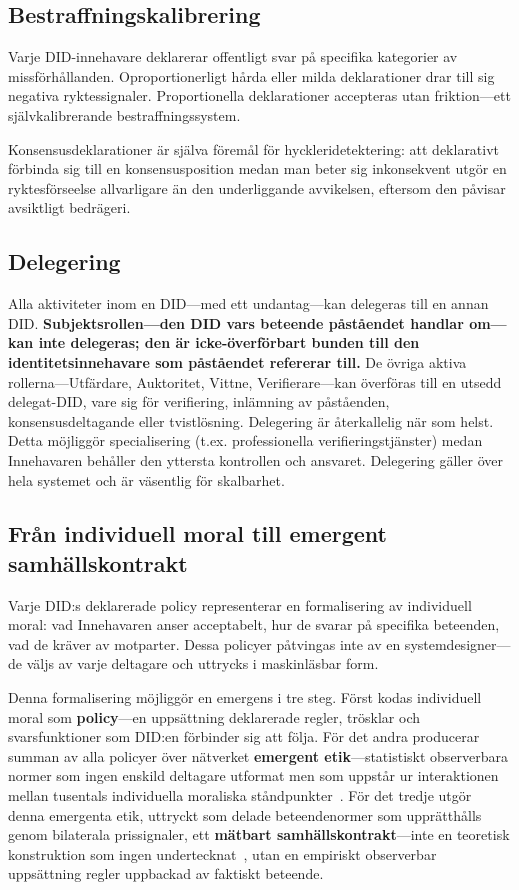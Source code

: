 \documentclass[11pt,a4paper,twocolumn]{article}
\begin{document}
\subsection{Bestraffningskalibrering}

Varje DID-innehavare deklarerar offentligt svar på specifika kategorier av missförhållanden. Oproportionerligt hårda eller milda deklarationer drar till sig negativa ryktessignaler. Proportionella deklarationer accepteras utan friktion---ett självkalibrerande bestraffningssystem.

Konsensusdeklarationer är själva föremål för hyckleridetektering: att deklarativt förbinda sig till en konsensusposition medan man beter sig inkonsekvent utgör en ryktesförseelse allvarligare än den underliggande avvikelsen, eftersom den påvisar avsiktligt bedrägeri.

\subsection{Delegering}

Alla aktiviteter inom en DID---med ett undantag---kan delegeras till en annan DID. \textbf{Subjektsrollen---den DID vars beteende påståendet handlar om---kan inte delegeras; den är icke-överförbart bunden till den identitetsinnehavare som påståendet refererar till.} De övriga aktiva rollerna---Utfärdare, Auktoritet, Vittne, Verifierare---kan överföras till en utsedd delegat-DID, vare sig för verifiering, inlämning av påståenden, konsensusdeltagande eller tvistlösning. Delegering är återkallelig när som helst. Detta möjliggör specialisering (t.ex. professionella verifieringstjänster) medan Innehavaren behåller den yttersta kontrollen och ansvaret. Delegering gäller över hela systemet och är väsentlig för skalbarhet.

\subsection{Från individuell moral till emergent samhällskontrakt}

Varje DID:s deklarerade policy representerar en formalisering av individuell moral: vad Innehavaren anser acceptabelt, hur de svarar på specifika beteenden, vad de kräver av motparter. Dessa policyer påtvingas inte av en systemdesigner---de väljs av varje deltagare och uttrycks i maskinläsbar form.

Denna formalisering möjliggör en emergens i tre steg. Först kodas individuell moral som \textbf{policy}---en uppsättning deklarerade regler, trösklar och svarsfunktioner som DID:en förbinder sig att följa. För det andra producerar summan av alla policyer över nätverket \textbf{emergent etik}---statistiskt observerbara normer som ingen enskild deltagare utformat men som uppstår ur interaktionen mellan tusentals individuella moraliska ståndpunkter~\cite{durkheim1893}. För det tredje utgör denna emergenta etik, uttryckt som delade beteendenormer som upprätthålls genom bilaterala prissignaler, ett \textbf{mätbart samhällskontrakt}---inte en teoretisk konstruktion som ingen undertecknat~\cite{rawls1971}, utan en empiriskt observerbar uppsättning regler uppbackad av faktiskt beteende.
\end{document}
